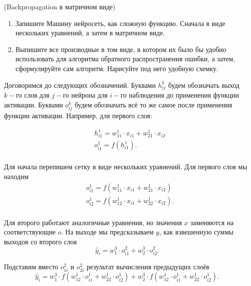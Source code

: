\begin{problem}{(Backpropagation в матричном виде)}
    \begin{enumerate}
        \item  Запишите Машину нейросеть, как сложную функцию. Сначала в виде нескольких уравнений, а затем в матричном виде. 
    	
    	\item Выпишите все производные в том виде, в котором их было бы удобно использовать для алгоритма обратного распространения ошибки, а затем, сформулируйте сам алгоритм. Нарисуйте под него удобную схемку.
    \end{enumerate}
\end{problem}

\begin{sol} Договоримся до следующих обозначений. Буквами $h^k_{ij}$ будем обозначать выход $k-$го слоя для $j-$го нейрона для $i-$го наблюдения до применения функции активации. Буквами  $o^k_{ij}$ будем обозначать всё то же самое после применения функции активации. Например, для первого слоя:

\begin{equation*}
    \begin{aligned} 
    & h^1_{i1} = w^1_{11} \cdot x_{i1} +  w^1_{21} \cdot x_{i2} \\
    & o^1_{i1} = f(h_{i1}^1). \\
    \end{aligned} 
\end{equation*}

 Для начала перепишем сетку в виде нескольких уравнений. Для первого слоя мы находим
\begin{equation*}
    \begin{aligned} 
    & o^1_{i1} = f( w^1_{11} \cdot x_{i1} +  w^1_{21} \cdot x_{i2}) \\
    & o^1_{i2} = f( w^1_{12} \cdot x_{i1} +  w^1_{22} \cdot x_{i2}). \\
    \end{aligned} 
\end{equation*}

Для второго работают аналогичные уравнения, но значения $x$ заменяются на соответствующие $o$. На выходе мы предсказываем $y$, как взвешенную суммы выходов со второго слоя
\[
\hat{y}_i = w_1^3 \cdot o^2_{i1} + w_2^3 \cdot o^2_{i2}.
\]

Подставим вместо $o^2_{1i}$ и $o^2_{2i}$ результат вычисления предыдущих слоёв
\[
\hat{y}_i = w_1^3 \cdot f( w^1_{12} \cdot o^1_{i1} +  w^1_{22} \cdot o^1_{i2}) + w_2^3 \cdot f( w^1_{12} \cdot o^1_{i1} +  w^1_{22} \cdot o^1_{i2}).
\]


\end{sol}
